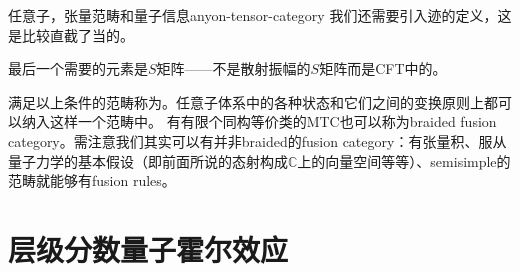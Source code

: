 \begin{back}{任意子，张量范畴和量子信息}{anyon-tensor-category}
    我们还需要引入迹的定义，这是比较直截了当的。

    最后一个需要的元素是$S$矩阵——不是散射振幅的$S$矩阵而是CFT中的。 %

    满足以上条件的范畴称为。任意子体系中的各种状态和它们之间的变换原则上都可以纳入这样一个范畴中。
    有有限个同构等价类的MTC也可以称为braided fusion category。需注意我们其实可以有并非braided的fusion category：有张量积、服从量子力学的基本假设（即前面所说的态射构成$\mathbb{C}$上的向量空间等等）、semisimple的范畴就能够有fusion rules。
\end{back}

\section{层级分数量子霍尔效应}